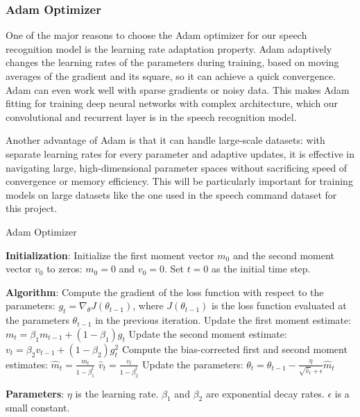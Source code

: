 \documentclass[a4paper]{report}
\begin{document}
{\subsubsection{Adam Optimizer}
One of the major reasons to choose the Adam optimizer for our speech recognition model is the learning rate adaptation property. Adam adaptively changes the learning rates of the parameters during training, based on moving averages of the gradient and its square, so it can achieve a quick convergence. Adam can even work well with sparse gradients or noisy data. This makes Adam fitting for training deep neural networks with complex architecture, which our convolutional and recurrent layer is in the speech recognition model.

Another advantage of Adam is that it can handle large-scale datasets: with separate learning rates for every parameter and adaptive updates, it is effective in navigating large, high-dimensional parameter spaces without sacrificing speed of convergence or memory efficiency. This will be particularly important for training models on large datasets like the one used in the speech command dataset for this project.
\begin{algorithm}
\caption{Adam Optimizer}
\begin{algorithmic}[1]
    \State \textbf{Initialization}:
    \State Initialize the first moment vector \( m_0 \) and the second moment vector \( v_0 \) to zeros: \( m_0 = 0 \) and \( v_0 = 0 \).
    \State Set \( t = 0 \) as the initial time step.
    
    \State \textbf{Algorithm}:
        \State Compute the gradient of the loss function with respect to the parameters: \( g_t = \nabla_{\theta} J(\theta_{t-1}) \), where \( J(\theta_{t-1}) \) is the loss function evaluated at the parameters \( \theta_{t-1} \) in the previous iteration.
        \State Update the first moment estimate:
        \State \( m_t = \beta_1 m_{t-1} + (1 - \beta_1) g_t \)
        \State Update the second moment estimate:
        \State \( v_t = \beta_2 v_{t-1} + (1 - \beta_2) g_t^2 \)
        \State Compute the bias-corrected first and second moment estimates:
        \State \( \hat{m}_t = \frac{m_t}{1 - \beta_1^t} \)
        \State \( \hat{v}_t = \frac{v_t}{1 - \beta_2^t} \)
        \State Update the parameters:
        \State \( \theta_t = \theta_{t-1} - \frac{\eta}{\sqrt{\hat{v}_t} + \epsilon} \hat{m}_t \)
    \EndFor
    
    \State \textbf{Parameters}:
    \State \( \eta \) is the learning rate.
    \State \( \beta_1 \) and \( \beta_2 \) are exponential decay rates.
    \State \( \epsilon \) is a small constant.
\end{algorithmic}
\end{algorithm}
\newpage
}
\end{document}

